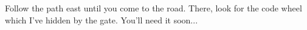 \documentclass[a5paper, 12pt]{article}
\begin{document}
\begin{minipage}{0.6\textwidth}
Follow the path east until you come to the road.
There, look for the code wheel which I've hidden by the gate.
You'll need it soon...
\end{minipage}

\initials
\end{document}
